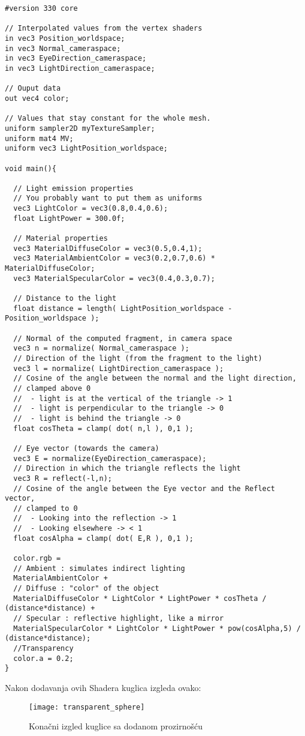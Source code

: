 \begin{lstlisting}[style = myC++ , label = {code:22}, caption = {Konačni Shader fragmenata}]
#version 330 core

// Interpolated values from the vertex shaders
in vec3 Position_worldspace;
in vec3 Normal_cameraspace;
in vec3 EyeDirection_cameraspace;
in vec3 LightDirection_cameraspace;

// Ouput data
out vec4 color;

// Values that stay constant for the whole mesh.
uniform sampler2D myTextureSampler;
uniform mat4 MV;
uniform vec3 LightPosition_worldspace;

void main(){

  // Light emission properties
  // You probably want to put them as uniforms
  vec3 LightColor = vec3(0.8,0.4,0.6);
  float LightPower = 300.0f;

  // Material properties
  vec3 MaterialDiffuseColor = vec3(0.5,0.4,1);
  vec3 MaterialAmbientColor = vec3(0.2,0.7,0.6) * MaterialDiffuseColor;
  vec3 MaterialSpecularColor = vec3(0.4,0.3,0.7);

  // Distance to the light
  float distance = length( LightPosition_worldspace - Position_worldspace );

  // Normal of the computed fragment, in camera space
  vec3 n = normalize( Normal_cameraspace );
  // Direction of the light (from the fragment to the light)
  vec3 l = normalize( LightDirection_cameraspace );
  // Cosine of the angle between the normal and the light direction, 
  // clamped above 0
  //  - light is at the vertical of the triangle -> 1
  //  - light is perpendicular to the triangle -> 0
  //  - light is behind the triangle -> 0
  float cosTheta = clamp( dot( n,l ), 0,1 );

  // Eye vector (towards the camera)
  vec3 E = normalize(EyeDirection_cameraspace);
  // Direction in which the triangle reflects the light
  vec3 R = reflect(-l,n);
  // Cosine of the angle between the Eye vector and the Reflect vector,
  // clamped to 0
  //  - Looking into the reflection -> 1
  //  - Looking elsewhere -> < 1
  float cosAlpha = clamp( dot( E,R ), 0,1 );

  color.rgb = 
  // Ambient : simulates indirect lighting
  MaterialAmbientColor +
  // Diffuse : "color" of the object
  MaterialDiffuseColor * LightColor * LightPower * cosTheta / (distance*distance) +
  // Specular : reflective highlight, like a mirror
  MaterialSpecularColor * LightColor * LightPower * pow(cosAlpha,5) / (distance*distance);
  //Transparency
  color.a = 0.2;
}
\end{lstlisting}\newpage
Nakon dodavanja ovih Shadera kuglica izgleda ovako:
\begin{figure}[!http]
	\begin{center}
		\texttt{[image: transparent\_sphere]}
		\caption{Konačni izgled kuglice sa dodanom prozirnošću}
		\label{fig:34}
	\end{center}
\end{figure}

